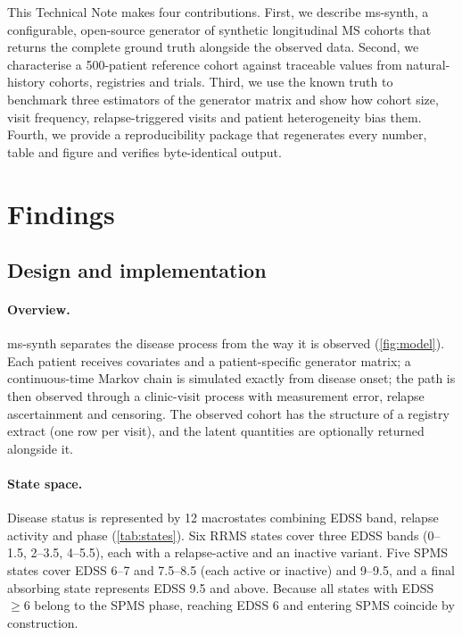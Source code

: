 \documentclass[11pt,a4paper]{article}
\begin{document}
This Technical Note makes four contributions. First, we describe ms-synth, a configurable, open-source generator of synthetic longitudinal MS cohorts that returns the complete ground truth alongside the observed data. Second, we characterise a 500-patient reference cohort against traceable values from natural-history cohorts, registries and trials. Third, we use the known truth to benchmark three estimators of the generator matrix and show how cohort size, visit frequency, relapse-triggered visits and patient heterogeneity bias them. Fourth, we provide a reproducibility package that regenerates every number, table and figure and verifies byte-identical output.

\section*{Findings}

\subsection*{Design and implementation}

\paragraph{Overview.}
ms-synth separates the disease process from the way it is observed (\cref{fig:model}). Each patient receives covariates and a patient-specific generator matrix; a continuous-time Markov chain is simulated exactly from disease onset; the path is then observed through a clinic-visit process with measurement error, relapse ascertainment and censoring. The observed cohort has the structure of a registry extract (one row per visit), and the latent quantities are optionally returned alongside it.

\paragraph{State space.}
Disease status is represented by 12 macrostates combining EDSS band, relapse activity and phase (\cref{tab:states}). Six RRMS states cover three EDSS bands (0--1.5, 2--3.5, 4--5.5), each with a relapse-active and an inactive variant. Five SPMS states cover EDSS 6--7 and 7.5--8.5 (each active or inactive) and 9--9.5, and a final absorbing state represents EDSS 9.5 and above. Because all states with EDSS $\geq 6$ belong to the SPMS phase, reaching EDSS 6 and entering SPMS coincide by construction.
\end{document}
